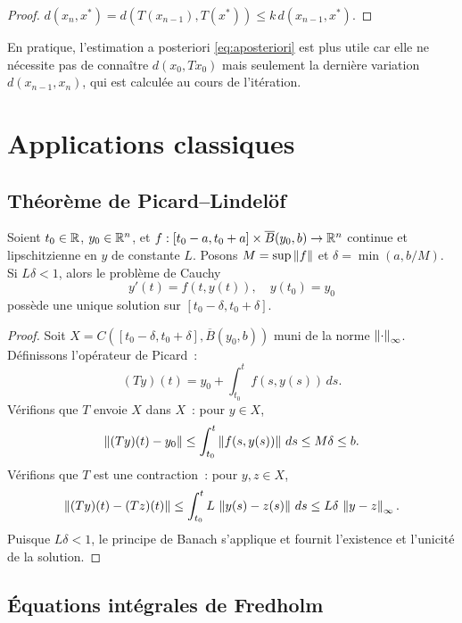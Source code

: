\begin{proof}
$d(x_n, x^*) = d(T(x_{n-1}), T(x^*)) \leq k \, d(x_{n-1}, x^*)$.
\end{proof}

\begin{remarque}
En pratique, l'estimation a posteriori \eqref{eq:aposteriori} est plus utile
car elle ne n\'ecessite pas de conna\^itre $d(x_0, Tx_0)$ mais seulement la
derni\`ere variation $d(x_{n-1}, x_n)$, qui est calcul\'ee au cours de l'it\'eration.
\end{remarque}

\section{Applications classiques}

\subsection{Th\'eor\`eme de Picard--Lindel\"of}

\begin{theoreme}
Soient $t_0 \in \mathbb{R}$, $y_0 \in \mathbb{R}^n$, et $f : [t_0 - a, t_0 + a] \times
\overline{B}(y_0, b) \to \mathbb{R}^n$ continue et lipschitzienne en $y$ de constante
$L$. Posons $M = \sup \left\| f \right\|$ et $\delta = \min(a, b/M)$. Si $L\delta < 1$,
alors le probl\`eme de Cauchy
\[
    y'(t) = f(t, y(t)), \quad y(t_0) = y_0
\]
poss\`ede une unique solution sur $[t_0 - \delta, t_0 + \delta]$.
\end{theoreme}

\begin{proof}
Soit $X = C([t_0 - \delta, t_0 + \delta], \overline{B}(y_0, b))$ muni de la
norme $\left\| \cdot \right\|_\infty$. D\'efinissons l'op\'erateur de Picard~:
\[
    (Ty)(t) = y_0 + \int_{t_0}^t f(s, y(s)) \, ds.
\]
V\'erifions que $T$ envoie $X$ dans $X$~: pour $y \in X$,
\[
    \left\| (Ty)(t) - y_0 \right\| \leq \int_{t_0}^t \left\| f(s, y(s)) \right\| \, ds \leq M\delta \leq b.
\]
V\'erifions que $T$ est une contraction~: pour $y, z \in X$,
\[
    \left\| (Ty)(t) - (Tz)(t) \right\| \leq \int_{t_0}^t L \, \left\| y(s) - z(s) \right\| \, ds
    \leq L\delta \, \left\| y - z \right\|_\infty.
\]
Puisque $L\delta < 1$, le principe de Banach s'applique et fournit l'existence
et l'unicit\'e de la solution.
\end{proof}

\subsection{\'Equations int\'egrales de Fredholm}

